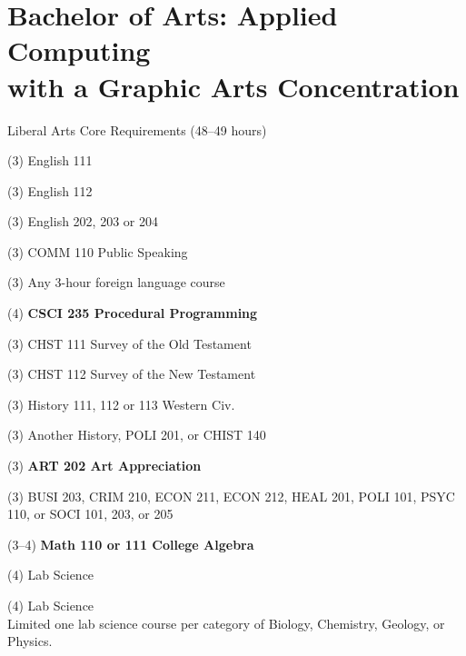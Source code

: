 %
\section*{Bachelor of Arts: Applied Computing\\with a Graphic Arts Concentration}

\begin{reqgroup}{Liberal Arts Core Requirements (48--49 hours)}
\begin{checklist}
\begin{minipage}[t]{0.5\linewidth}
	\item (3) English 111
	\item (3) English 112
	\item (3) English 202, 203 or 204
	\item (3) COMM 110 Public Speaking
	\item (3) Any 3-hour foreign language course
	\item (4) \textbf{CSCI 235  Procedural Programming}
	\item (3) CHST 111  Survey of the Old Testament
	\item (3) CHST 112  Survey of the New Testament
	\item (3) History 111, 112 or 113 Western Civ.
\end{minipage}
\begin{minipage}[t]{0.5\linewidth}
	\item (3)	Another History, POLI 201, or CHIST 140
	\item (3)	\textbf{ART 202 Art Appreciation}
	\item (3)	BUSI 203, CRIM 210, ECON 211, ECON 212, HEAL 201, POLI 101, PSYC 110, or SOCI 101, 203, or 205
	\item (3--4)	\textbf{Math 110 or 111 College Algebra}
	\item (4)	 Lab Science
	\item (4)	 Lab Science\\Limited one lab science course per category of Biology, Chemistry,
Geology, or Physics.
\end{minipage}
\end{checklist}
\end{reqgroup}

